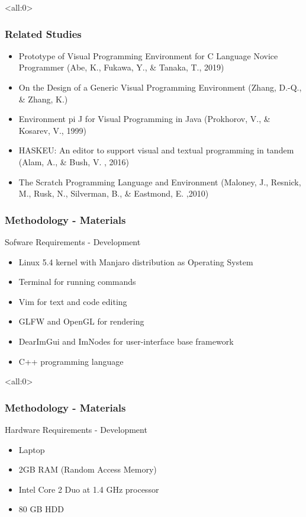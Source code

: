 \documentclass[handout]{beamer}
\begin{document}
\begin{frame}<all:0>
	\frametitle{Related Studies}
	\begin{itemize}
		\item<1-> Prototype of Visual Programming Environment for C Language Novice Programmer (Abe, K., Fukawa, Y., \& Tanaka, T., 2019)
		\item<2-> On the Design of a Generic Visual Programming Environment (Zhang, D.-Q., \& Zhang, K.)
		\item<3-> Environment pi J for Visual Programming in Java (Prokhorov, V., \& Kosarev, V., 1999)
		\item<4-> HASKEU: An editor to support visual and textual programming in tandem (Alam, A., \& Bush, V. , 2016)
		\item<5-> The Scratch Programming Language and Environment (Maloney, J., Resnick, M., Rusk, N., Silverman, B., \& Eastmond, E. ,2010)
	\end{itemize}
\end{frame}

\begin{frame}
	\frametitle{Methodology - Materials}
	\begin{block}{Sofware Requirements - Development}
		\begin{itemize}
			\item<1-> Linux 5.4 kernel with Manjaro distribution as Operating System
			\item<2-> Terminal for running commands
			\item<3-> Vim for text and code editing
			\item<4-> GLFW and OpenGL for rendering
			\item<5-> DearImGui and ImNodes for user-interface base framework
			\item<6-> C++ programming language
		\end{itemize}
	\end{block}
\end{frame}

\begin{frame}<all:0>
	\frametitle{Methodology - Materials}
	\begin{block}{Hardware Requirements - Development}
		\begin{itemize}
			\item<1-> Laptop
			\item<2-> 2GB RAM (Random Access Memory)
			\item<3-> Intel Core 2 Duo at 1.4 GHz processor
			\item<4-> 80 GB HDD
		\end{itemize}
	\end{block}
\end{frame}
\end{document}
